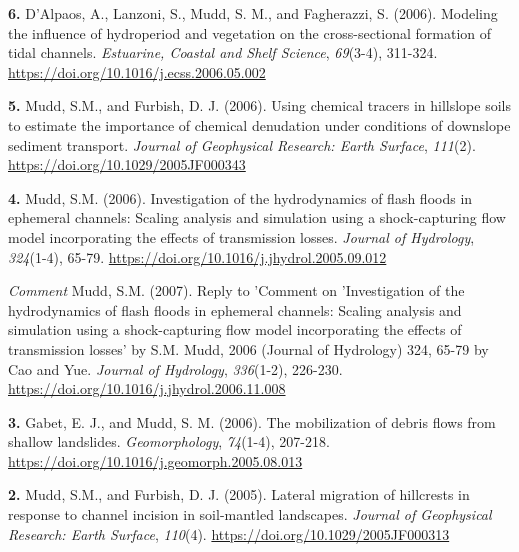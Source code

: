 \documentclass[10pt, a4paper]{article}
\newcommand{\years}[1]{\marginnote{\scriptsize #1}}
\begin{document}
\years{2006}\hangindent=0.7cm\textbf{6. }D'Alpaos, A., Lanzoni, S., Mudd, S. M., and Fagherazzi, S. (2006). Modeling the influence of hydroperiod and vegetation on the cross-sectional formation of tidal channels. \textit{Estuarine, Coastal and Shelf Science}, \textit{69}(3-4), 311-324. \href{https://doi.org/10.1016/j.ecss.2006.05.002}{https://doi.org/10.1016/j.ecss.2006.05.002}\par

\years{2006}\hangindent=0.7cm\textbf{5. }Mudd, S.M., and Furbish, D. J. (2006). Using chemical tracers in hillslope soils to estimate the importance of chemical denudation under conditions of downslope sediment transport. \textit{Journal of Geophysical Research: Earth Surface}, \textit{111}(2). \href{https://doi.org/10.1029/2005JF000343}{https://doi.org/10.1029/2005JF000343}\par

\years{2006}\hangindent=0.7cm\textbf{4. }Mudd, S.M. (2006). Investigation of the hydrodynamics of flash floods in ephemeral channels: Scaling analysis and simulation using a shock-capturing flow model incorporating the effects of transmission losses. \textit{Journal of Hydrology}, \textit{324}(1-4), 65-79. \href{https://doi.org/10.1016/j.jhydrol.2005.09.012}{https://doi.org/10.1016/j.jhydrol.2005.09.012}\par
\begin{footnotesize}
\hangindent=0.7cm\textit{Comment }Mudd, S.M. (2007). Reply to 'Comment on 'Investigation of the hydrodynamics of flash floods in ephemeral channels: Scaling analysis and simulation using a shock-capturing flow model incorporating the effects of transmission losses' by S.M. Mudd, 2006 (Journal of Hydrology) 324, 65-79 by Cao and Yue. \textit{Journal of Hydrology}, \textit{336}(1-2), 226-230. \href{https://doi.org/10.1016/j.jhydrol.2006.11.008}{https://doi.org/10.1016/j.jhydrol.2006.11.008}\par
\end{footnotesize}

\years{2006}\hangindent=0.7cm\textbf{3. }Gabet, E. J., and Mudd, S. M. (2006). The mobilization of debris flows from shallow landslides. \textit{Geomorphology}, \textit{74}(1-4), 207-218. \href{https://doi.org/10.1016/j.geomorph.2005.08.013}{https://doi.org/10.1016/j.geomorph.2005.08.013}\par


\years{2005}\hangindent=0.7cm\textbf{2. }Mudd, S.M., and Furbish, D. J. (2005). Lateral migration of hillcrests in response to channel incision in soil-mantled landscapes. \textit{Journal of Geophysical Research: Earth Surface}, \textit{110}(4). \href{https://doi.org/10.1029/2005JF000313}{https://doi.org/10.1029/2005JF000313}\par
\end{document}
